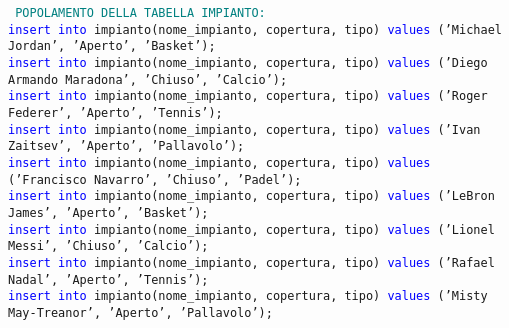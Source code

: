 \documentclass{article}
\begin{document}
    \begin{flushleft}
        \texttt{
        \textcolor{teal}{POPOLAMENTO DELLA TABELLA IMPIANTO:} \\
        \hspace*{0.5em}\textcolor{blue}{insert into} impianto(nome\_impianto, copertura, tipo) \textcolor{blue}{values} ('Michael Jordan', \hspace*{0.5em}'Aperto', 'Basket'); \\
        \hspace*{0.5em}\textcolor{blue}{insert into} impianto(nome\_impianto, copertura, tipo) \textcolor{blue}{values} ('Diego Armando \hspace*{0.5em}Maradona', 'Chiuso', 'Calcio'); \\
        \hspace*{0.5em}\textcolor{blue}{insert into} impianto(nome\_impianto, copertura, tipo) \textcolor{blue}{values} ('Roger Federer', \hspace*{0.5em}'Aperto', 'Tennis'); \\
        \hspace*{0.5em}\textcolor{blue}{insert into} impianto(nome\_impianto, copertura, tipo) \textcolor{blue}{values} ('Ivan Zaitsev', \hspace*{0.5em}'Aperto', 'Pallavolo'); \\
        \hspace*{0.5em}\textcolor{blue}{insert into} impianto(nome\_impianto, copertura, tipo) \textcolor{blue}{values} ('Francisco \hspace*{0.5em}Navarro', 'Chiuso', 'Padel'); \\
        \hspace*{0.5em}\textcolor{blue}{insert into} impianto(nome\_impianto, copertura, tipo) \textcolor{blue}{values} ('LeBron James', \hspace*{0.5em}'Aperto', 'Basket'); \\
        \hspace*{0.5em}\textcolor{blue}{insert into} impianto(nome\_impianto, copertura, tipo) \textcolor{blue}{values} ('Lionel Messi', \hspace*{0.5em}'Chiuso', 'Calcio'); \\
        \hspace*{0.5em}\textcolor{blue}{insert into} impianto(nome\_impianto, copertura, tipo) \textcolor{blue}{values} ('Rafael Nadal', \hspace*{0.5em}'Aperto', 'Tennis'); \\
        \hspace*{0.5em}\textcolor{blue}{insert into} impianto(nome\_impianto, copertura, tipo) \textcolor{blue}{values} ('Misty \hspace*{0.5em}May-Treanor', 'Aperto', 'Pallavolo'); \\
}
\end{flushleft}
\end{document}
